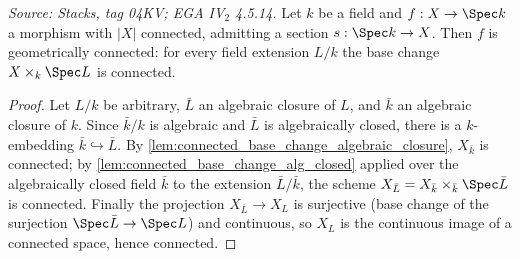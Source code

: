 \begin{theorem}

  \label{thm:geometrically_connected_of_section}
  \textit{Source: Stacks, tag 04KV; EGA IV\(_2\) 4.5.14.}
  Let \(k\) be a field and \(f : X \to \Spec k\) a morphism with
  \(|X|\) connected, admitting a section \(s : \Spec k \to X\). Then
  \(f\) is geometrically connected: for every field extension \(L/k\)
  the base change \(X \times_k \Spec L\) is connected.
\end{theorem}
\begin{proof}
  \leanok
  Let \(L/k\) be arbitrary, \(\bar L\) an algebraic closure of \(L\),
  and \(\bar k\) an algebraic closure of \(k\). Since \(\bar k/k\) is
  algebraic and \(\bar L\) is algebraically closed, there is a
  \(k\)-embedding \(\bar k \hookrightarrow \bar L\). By
  \cref{lem:connected_base_change_algebraic_closure},
  \(X_{\bar k}\) is connected; by
  \cref{lem:connected_base_change_alg_closed} applied over the
  algebraically closed field \(\bar k\) to the extension
  \(\bar L / \bar k\), the scheme
  \(X_{\bar L} = X_{\bar k} \times_{\bar k} \Spec \bar L\) is
  connected. Finally the projection \(X_{\bar L} \to X_L\) is
  surjective (base change of the surjection
  \(\Spec \bar L \to \Spec L\)) and continuous, so \(X_L\) is the
  continuous image of a connected space, hence connected.
\end{proof}


